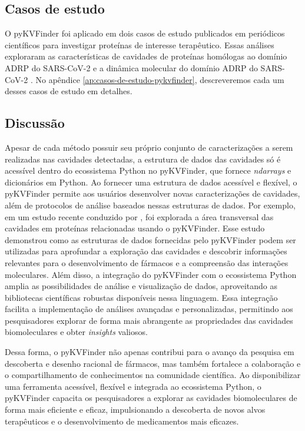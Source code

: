 \documentclass[Portugues]{phdquali}
\begin{document}
\subsection{Casos de estudo}

O pyKVFinder foi aplicado em dois casos de estudo publicados em periódicos científicos para investigar proteínas de interesse terapêutico. Essas análises exploraram as características de cavidades de proteínas homólogas ao domínio ADRP do SARS-CoV-2 e a dinâmica molecular do domínio ADRP do SARS-CoV-2 \cite{guerra2021}. No apêndice \ref{ap:casos-de-estudo-pykvfinder}, descreveremos cada um desses casos de estudo em detalhes.


\subsection{Discussão}

Apesar de cada método possuir seu próprio conjunto de caracterizações a serem realizadas nas cavidades detectadas, a estrutura de dados das cavidades só é acessível dentro do ecossistema Python no pyKVFinder, que fornece \textit{ndarrays} e dicionários em Python. Ao fornecer uma estrutura de dados acessível e flexível, o pyKVFinder permite aos usuários desenvolver novas caracterizações de cavidades, além de protocolos de análise baseados nessas estruturas de dados. Por exemplo, em um estudo recente conduzido por \cite{jefferson2023}, foi explorada a área transversal das cavidades em proteínas relacionadas usando o pyKVFinder. Esse estudo demonstrou como as estruturas de dados fornecidas pelo pyKVFinder podem ser utilizadas para aprofundar a exploração das cavidades e descobrir informações relevantes para o desenvolvimento de fármacos e a compreensão das interações moleculares. Além disso, a integração do pyKVFinder com o ecossistema Python amplia as possibilidades de análise e visualização de dados, aproveitando as bibliotecas científicas robustas disponíveis nessa linguagem. Essa integração facilita a implementação de análises avançadas e personalizadas, permitindo aos pesquisadores explorar de forma mais abrangente as propriedades das cavidades biomoleculares e obter \textit{insights} valiosos.

Dessa forma, o pyKVFinder não apenas contribui para o avanço da pesquisa em descoberta e desenho racional de fármacos, mas também fortalece a colaboração e o compartilhamento de conhecimentos na comunidade científica. Ao disponibilizar uma ferramenta acessível, flexível e integrada ao ecossistema Python, o pyKVFinder capacita os pesquisadores a explorar as cavidades biomoleculares de forma mais eficiente e eficaz, impulsionando a descoberta de novos alvos terapêuticos e o desenvolvimento de medicamentos mais eficazes.
\end{document}

